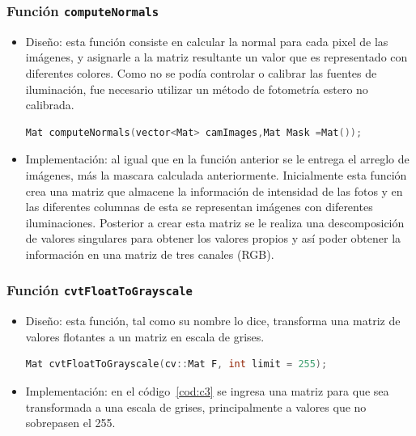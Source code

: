 \documentclass[twocolumn,11pts]{IEEEtran}
\begin{document}
\subsubsection{Función \texttt{computeNormals}}
\begin{itemize}
\item Diseño: esta función consiste en calcular la normal para cada pixel de las imágenes, y asignarle  a la matriz resultante un valor que es representado con diferentes colores. Como no se podía controlar o calibrar las fuentes de iluminación, fue necesario utilizar un método de fotometría estero no calibrada. 
\begin{lstlisting}[float,language=C++,caption={Prototipo función \texttt{computeNormals}.},label=cod:c2]
Mat computeNormals(vector<Mat> camImages,Mat Mask =Mat());
\end{lstlisting}
\item Implementación: al igual que en la función anterior se le entrega el arreglo de imágenes, más la mascara calculada anteriormente. Inicialmente esta función crea una matriz que almacene la información de intensidad de las fotos y en las diferentes columnas de esta se representan imágenes con diferentes iluminaciones. Posterior a crear esta matriz se le realiza una descomposición de valores singulares para obtener los valores propios y así poder obtener la información en una matriz de tres canales (RGB).
\end{itemize}
\subsubsection{Función \texttt{cvtFloatToGrayscale}}
\begin{itemize}
\item Diseño: esta función, tal como su nombre lo dice, transforma una matriz de valores flotantes a un matriz en escala de grises.

\begin{lstlisting}[float,language=C++,caption={Prototipo función \texttt{cvtFloatToGrayscale}.},label=cod:c3]
Mat cvtFloatToGrayscale(cv::Mat F, int limit = 255);
\end{lstlisting}

\item Implementación: en el código~\ref{cod:c3} se ingresa una matriz para que sea transformada a una escala de grises, principalmente a valores que no sobrepasen el 255.

\end{itemize}
\end{document}
